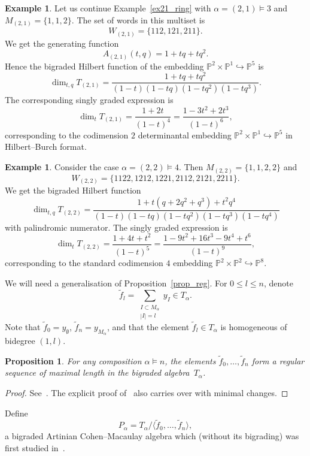 \documentclass[a4paper,11pt]{amsart}
\theoremstyle{plain}
\newtheorem{proposition}[theorem]{Proposition}
\theoremstyle{definition}
\newtheorem{example}[theorem]{Example}
\newcommand{\pa}{T} %
\newcommand{\tf}{\widetilde{f}}
\renewcommand{\P}{\mathbb{P}}
\begin{document}
\begin{example}\label{ex21} Let us continue Example~\ref{ex21_ring} with $\alpha=(2,1)\vDash 3$ and  
$M_{(2,1)}=\{1,1,2\}$. The set of words in this multiset is \[W_{(2,1)} = \{112, 121, 211\}.\] We get the generating function
\[A_{(2,1)}(t,q) = 1 + tq + tq^2.\]
Hence the bigraded Hilbert function of the embedding $\P^2\times\P^1\hookrightarrow \P^5$ is 
\[
\dim_{t,q}  \pa_{(2,1)}=  \frac{1 + tq + tq^2}{(1-t)(1-tq)(1-tq^2)(1-tq^3)}.
\]
The corresponding singly graded expression is 
\[
\dim_{t}  \pa_{(2,1)}=  \frac{1 + 2t}{(1-t)^4} = \frac{1 - 3 t^2 + 2 t^3}{(1-t)^6},
\]
corresponding to the codimension $2$ determinantal embedding $\P^2\times\P^1\hookrightarrow \P^5$ in Hilbert--Burch format. 
\end{example}

\begin{example}\label{ex22} Consider the case $\alpha=(2,2)\vDash 4$. Then 
$M_{(2,2)}=\{1,1,2,2\}$ and \[W_{(2,2)} = \{1122, 1212, 1221, 2112, 2121, 2211\}.\] We get the bigraded Hilbert function
\[
\dim_{t,q}  \pa_{(2,2)}=  \frac{1 + t(q+2q^2+q^3) + t^2q^4}{(1-t)(1-tq)(1-tq^2)(1-tq^3)(1-tq^4)}
\]
with palindromic numerator. The singly graded expression is 
\[
\dim_{t}  \pa_{(2,2)}=  \frac{1 + 4t+t^2}{(1-t)^5} = \frac{1 - 9 t^2 + 16 t^3 - 9t^4+t^6}{(1-t)^9},
\]
corresponding to the standard codimension $4$ embedding $\P^2\times\P^2\hookrightarrow \P^8$. 
\end{example}
We will need a generalisation of Proposition~\ref{prop_reg}. For $0\leq l\leq n$, denote
\[\tf_l= \sum_{\substack{I \subset M_\alpha \\ |I|=l}} y_{\scriptscriptstyle I}\in \pa_\alpha. \]
Note that $\tf_0=y_{\scriptscriptstyle\emptyset}$, $\tf_n = y_{\scriptscriptstyle M_\alpha}$, and that the element $\tf_l\in\pa_\alpha$ is homogeneous of bidegree $(1,l)$.

\begin{proposition} For any composition $\alpha \vDash n$, the elements $\tf_0, \ldots, \tf_n$ form a regular sequence of maximal length in the bigraded algebra~$\pa_\alpha$. 
\end{proposition}
\begin{proof} See~\cite[Section 4]{ORS}. The explicit proof of~\cite[Prop.2.7]{AS} also carries over with minimal changes. 
\end{proof}
Define
\[
P_\alpha = T_\alpha/\langle \tf_0,\ldots, \tf_n\rangle, 
\]
a bigraded Artinian Cohen--Macaulay algebra which (without its bigrading) was first studied in~\cite{ORS}.
\end{document}
